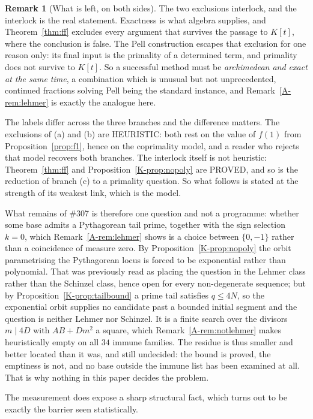 \documentclass[11pt]{article}
\theoremstyle{definition}
\newtheorem{remark}[theorem]{Remark}
\begin{document}
\begin{remark}[What is left, on both sides]
The two exclusions interlock, and the interlock is the real statement. Exactness is what algebra
supplies, and Theorem~\ref{thm:ff} excludes every argument that survives the passage to $K[t]$,
where the conclusion is false. The Pell construction escapes that exclusion for one reason only:
its final input is the primality of a determined term, and primality does not survive to $K[t]$. So a
successful method must be \emph{archimedean and exact at the same time}, a combination which is
unusual but not unprecedented, continued fractions solving Pell being the standard instance, and
Remark~\ref{A-rem:lehmer} is exactly the analogue here.

The labels differ across the three branches and the difference matters. The exclusions of (a) and
(b) are \textup{HEURISTIC}: both rest on the value of $f(1)$ from Proposition~\ref{prop:f1}, hence on
the coprimality model, and a reader who rejects that model recovers both branches. The interlock
itself is not heuristic: Theorem~\ref{thm:ff} and Proposition~\ref{K-prop:nopoly} are
\textup{PROVED}, and so is the reduction of branch (c) to a primality question. So what follows is
stated at the strength of its weakest link, which is the model.

What remains of \#307 is therefore one question and not a programme: whether some base admits a
Pythagorean tail prime, together with the sign selection $k=0$, which Remark~\ref{A-rem:lehmer} shows
is a choice between $\{0,-1\}$ rather than a coincidence of measure zero. By
Proposition~\ref{K-prop:nopoly} the orbit parametrising the Pythagorean locus is forced to be
exponential rather than polynomial. That was previously read as placing the question in the Lehmer
class rather than the Schinzel class, hence open for every non-degenerate sequence; but by
Proposition~\ref{K-prop:tailbound} a prime tail satisfies $q\le4N$, so the exponential orbit supplies
no candidate past a bounded initial segment and the question is neither Lehmer nor Schinzel. It is a
finite search over the divisors $m\mid4D$ with $AB+Dm^2$ a square, which
Remark~\ref{A-rem:notlehmer} makes heuristically empty on all $34$ immune families. The residue is
thus smaller and better located than it was, and still undecided: the bound is proved, the
emptiness is not, and no base outside the immune list has been examined at all. That is why nothing
in this paper decides the problem.
\end{remark}

The measurement does expose a sharp structural fact, which turns out to be exactly the barrier seen
statistically.
\end{document}
